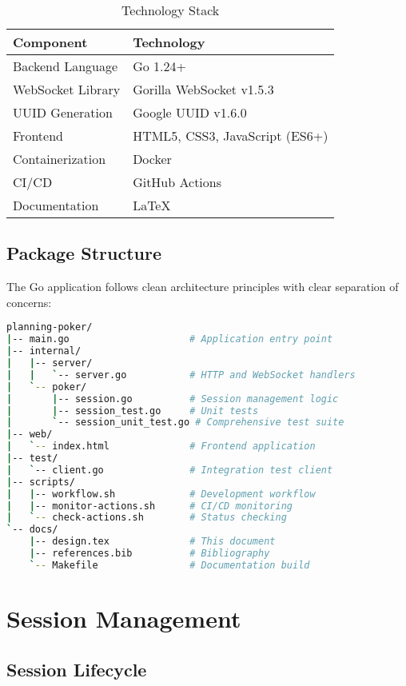 \documentclass[11pt,a4paper]{article}
\begin{document}
\begin{table}[H]
\centering
\begin{tabular}{@{}ll@{}}
\toprule
\textbf{Component} & \textbf{Technology} \\
\midrule
Backend Language & Go 1.24+ \\
WebSocket Library & Gorilla WebSocket v1.5.3 \\
UUID Generation & Google UUID v1.6.0 \\
Frontend & HTML5, CSS3, JavaScript (ES6+) \\
Containerization & Docker \\
CI/CD & GitHub Actions \\
Documentation & \LaTeX \\
\bottomrule
\end{tabular}
\caption{Technology Stack}
\label{tab:tech-stack}
\end{table}

\subsection{Package Structure}

The Go application follows clean architecture principles with clear separation of concerns:

\begin{lstlisting}[language=bash, caption=Project Structure]
planning-poker/
|-- main.go                     # Application entry point
|-- internal/
|   |-- server/
|   |   `-- server.go           # HTTP and WebSocket handlers
|   `-- poker/
|       |-- session.go          # Session management logic
|       |-- session_test.go     # Unit tests
|       `-- session_unit_test.go # Comprehensive test suite
|-- web/
|   `-- index.html              # Frontend application
|-- test/
|   `-- client.go               # Integration test client
|-- scripts/
|   |-- workflow.sh             # Development workflow
|   |-- monitor-actions.sh      # CI/CD monitoring
|   `-- check-actions.sh        # Status checking
`-- docs/
    |-- design.tex              # This document
    |-- references.bib          # Bibliography
    `-- Makefile                # Documentation build
\end{lstlisting}

\section{Session Management}

\subsection{Session Lifecycle}
\end{document}
